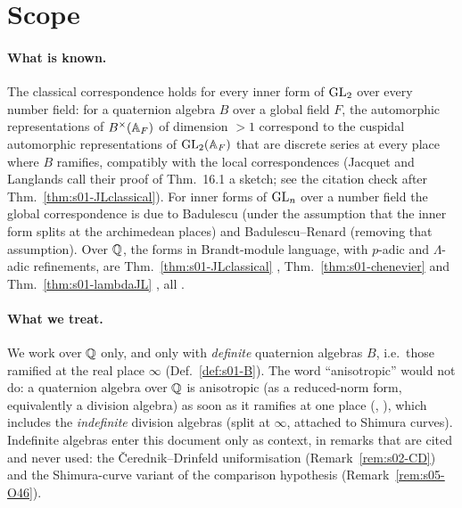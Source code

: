 \section{Scope}\label{ss:s00-scope}

\paragraph{What is known.} The classical correspondence holds for every inner form of $\mathrm{GL}_2$ over every number field: for a
quaternion algebra $B$ over a global field $F$, the automorphic representations of $B^\times(\mathbb{A}_F)$ of dimension $>1$ correspond
to the cuspidal automorphic representations of $\mathrm{GL}_2(\mathbb{A}_F)$ that are discrete series at every place where $B$ ramifies,
compatibly with the local correspondences \cite[Ch.~III, \S\S14--16, Thm.~16.1]{JL} \stcited{} (Jacquet and Langlands call their proof
of Thm.~16.1 a sketch; see the citation check after Thm.~\ref{thm:s01-JLclassical}). For inner forms of $\mathrm{GL}_n$ over a number field
the global correspondence is due to Badulescu \cite[\S5.1, Thm.~5.1]{Bad08} \stcited{} (under the assumption that the inner form
splits at the archimedean places) and Badulescu--Renard \cite[\S18.1, Thm.~18.1]{BR10} \stcited{} (removing that assumption).
Over $\mathbb{Q}$, the forms in Brandt-module language, with $p$-adic and $\Lambda$-adic refinements, are Thm.~\ref{thm:s01-JLclassical}
\cite{JL,Gr99}, Thm.~\ref{thm:s01-chenevier} \cite{Ch} and Thm.~\ref{thm:s01-lambdaJL} \cite{LV,Hs}, all \stcited.

\paragraph{What we treat.} We work over $\mathbb{Q}$ only, and only with \emph{definite} quaternion algebras $B$, i.e.\ those ramified at
the real place $\infty$ (Def.~\ref{def:s01-B}). The word ``anisotropic'' would not do: a quaternion algebra over $\mathbb{Q}$ is anisotropic
(as a reduced-norm form, equivalently a division algebra) as soon as it ramifies at one place (\stknown, \cite{Vo}), which includes the
\emph{indefinite} division algebras (split at $\infty$, attached to Shimura curves). Indefinite algebras enter this document
only as context, in remarks that are cited and never used: the \v{C}erednik--Drinfeld uniformisation (Remark~\ref{rem:s02-CD}) and
the Shimura-curve variant of the comparison hypothesis (Remark~\ref{rem:s05-O46}).

